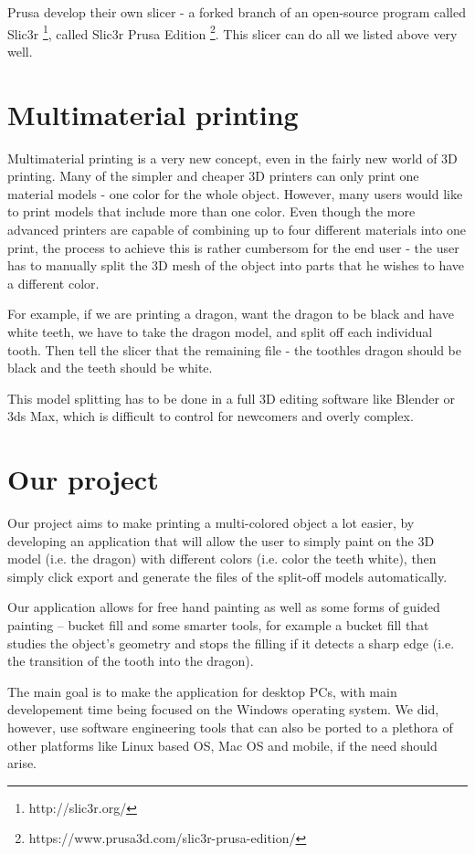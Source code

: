 Prusa develop their own slicer - a forked branch of an open-source program called Slic3r \footnote{http://slic3r.org/}, called Slic3r Prusa Edition \footnote{https://www.prusa3d.com/slic3r-prusa-edition/}. This slicer can do all we listed above very well.

\section{Multimaterial printing}

Multimaterial printing is a very new concept, even in the fairly new world of 3D printing. Many of the simpler and cheaper 3D printers can only print one material models - one color for the whole object. However, many users would like to print models that include more than one color. Even though the more advanced printers are capable of combining up to four different materials into one print, the process to achieve this is rather cumbersom for the end user - the user has to manually split the 3D mesh of the object into parts that he wishes to have a different color.

For example, if we are printing a dragon, want the dragon to be black and have white teeth, we have to take the dragon model, and split off each individual tooth. Then tell the slicer that the remaining file - the toothles dragon should be black and the teeth should be white.

This model splitting has to be done in a full 3D editing software like Blender or 3ds Max, which is difficult to control for newcomers and overly complex.

\section{Our project}

Our project aims to make printing a multi-colored object a lot easier, by developing an application that will allow the user to simply paint on the 3D model (i.e. the dragon) with different colors (i.e. color the teeth white), then simply click export and generate the files of the split-off models automatically.

Our application allows for free hand painting as well as some forms of guided painting -- bucket fill and some smarter tools, for example a bucket fill that studies the object's geometry and stops the filling if it detects a sharp edge (i.e. the transition of the tooth into the dragon).

The main goal is to make the application for desktop PCs, with main developement time being focused on the Windows operating system. We did, however, use software engineering tools that can also be ported to a plethora of other platforms like Linux based OS, Mac OS and mobile, if the need should arise.
